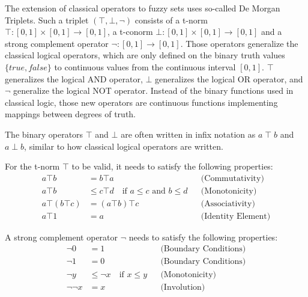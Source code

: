 The extension of classical operators to fuzzy sets uses so-called De Morgan Triplets. Such a triplet $(\top, \bot, \neg)$ consists of a t-norm $\top : [0, 1] \times [0, 1] \rightarrow [0, 1]$, a t-conorm $\bot : [0, 1] \times [0, 1] \rightarrow [0, 1]$ and a strong complement operator $\neg : [0, 1] \rightarrow [0, 1]$. Those operators generalize the classical logical operators, which are only defined on the binary truth values $\{true, false\}$ to continuous values from the continuous interval $[0, 1]$. $\top$ generalizes the logical AND operator, $\bot$ generalizes the logical OR operator, and $\neg$ generalize the logical NOT operator. Instead of the binary functions used in classical logic, those new operators are continuous functions implementing mappings between degrees of truth.

The binary operators $\top$ and $\bot$ are often written in infix notation as $a \; \top \; b$ and $a \; \bot \; b$, similar to how classical logical operators are written.
\smallskip

For the t-norm $\top$ to be valid, it needs to satisfy the following properties:
\begin{align*}
      a \top b          & = b \top a                                                    &  & \text{(Commutativity)}    \\
      a \top b          & \leq c \top d \quad \text{if } a \leq c \text{ and } b \leq d &  & \text{(Monotonicity)}     \\
      a \top (b \top c) & = (a \top b) \top c                                           &  & \text{(Associativity)}    \\
      a \top 1          & = a                                                           &  & \text{(Identity Element)}
\end{align*}

A strong complement operator $\neg$ needs to satisfy the following properties:
\begin{align*}
      \neg 0      & = 1                                   &  & \text{(Boundary Conditions)} \\
      \neg 1      & = 0                                   &  & \text{(Boundary Conditions)} \\
      \neg y      & \leq \neg x \quad \text{if } x \leq y &  & \text{(Monotonicity)}        \\
      \neg \neg x & = x                                   &  & \text{(Involution)}
\end{align*}

